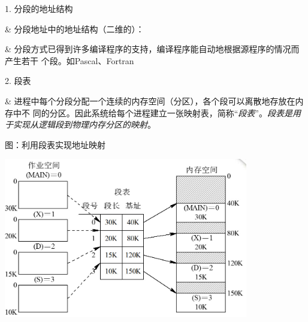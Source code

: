 \begin{frame}[fragile]{1. 分段的地址结构}
  \begin{easylist} 
  & 分段地址中的地址结构（二维的）：\vspace{0.5cm}
  \begin{center}
  \end{center}
  & 分段方式已得到许多编译程序的支持，编译程序能自动地根据源程序的情况而产生若干
  个段。如Pascal、Fortran 
  \end{easylist}
\end{frame}

\begin{frame}[fragile]{2. 段表}
  \begin{easylist} 
  & 进程中每个分段分配一个连续的内存空间（分区），各个段可以离散地存放在内存中不
  同的分区。因此系统给每个进程建立一张映射表，简称“{\em 段表}”。{\em 段表是用于实现从逻辑段到物理内存分区的映射}。
  \end{easylist}
\end{frame}


\begin{frame}[fragile]{图：利用段表实现地址映射}
  \begin{center}
    \includegraphics[width=0.8\textwidth]{figure/mem_seg1.jpg}
  \end{center}
\end{frame}

